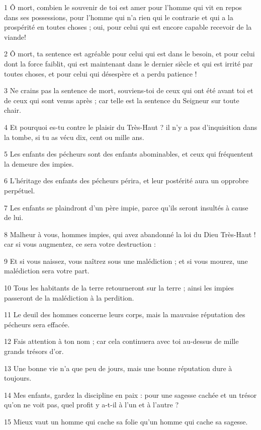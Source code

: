 \par 1 Ô mort, combien le souvenir de toi est amer pour l'homme qui vit en repos dans ses possessions, pour l'homme qui n'a rien qui le contrarie et qui a la prospérité en toutes choses ; oui, pour celui qui est encore capable recevoir de la viande!
\par 2 Ô mort, ta sentence est agréable pour celui qui est dans le besoin, et pour celui dont la force faiblit, qui est maintenant dans le dernier siècle et qui est irrité par toutes choses, et pour celui qui désespère et a perdu patience !
\par 3 Ne crains pas la sentence de mort, souviens-toi de ceux qui ont été avant toi et de ceux qui sont venus après ; car telle est la sentence du Seigneur sur toute chair.
\par 4 Et pourquoi es-tu contre le plaisir du Très-Haut ? il n'y a pas d'inquisition dans la tombe, si tu as vécu dix, cent ou mille ans.
\par 5 Les enfants des pécheurs sont des enfants abominables, et ceux qui fréquentent la demeure des impies.
\par 6 L'héritage des enfants des pécheurs périra, et leur postérité aura un opprobre perpétuel.
\par 7 Les enfants se plaindront d'un père impie, parce qu'ils seront insultés à cause de lui.
\par 8 Malheur à vous, hommes impies, qui avez abandonné la loi du Dieu Très-Haut ! car si vous augmentez, ce sera votre destruction :
\par 9 Et si vous naissez, vous naîtrez sous une malédiction ; et si vous mourez, une malédiction sera votre part.
\par 10 Tous les habitants de la terre retourneront sur la terre ; ainsi les impies passeront de la malédiction à la perdition.
\par 11 Le deuil des hommes concerne leurs corps, mais la mauvaise réputation des pécheurs sera effacée.
\par 12 Fais attention à ton nom ; car cela continuera avec toi au-dessus de mille grands trésors d'or.
\par 13 Une bonne vie n'a que peu de jours, mais une bonne réputation dure à toujours.
\par 14 Mes enfants, gardez la discipline en paix : pour une sagesse cachée et un trésor qu'on ne voit pas, quel profit y a-t-il à l'un et à l'autre ?
\par 15 Mieux vaut un homme qui cache sa folie qu'un homme qui cache sa sagesse.
